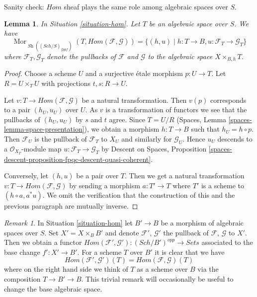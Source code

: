 \documentclass{stacks-project}
\theoremstyle{plain}
\newtheorem{lemma}[subsection]{Lemma}
\theoremstyle{definition}
\theoremstyle{remark}
\newtheorem{remark}[subsection]{Remark}
\numberwithin{equation}{subsection}
\def\Sch{\mathit{Sch}}
\def\Mor{\mathop{\mathrm{Mor}}\nolimits}
\def\Sh{\mathop{\mathit{Sh}}\nolimits}
\begin{document}
\noindent
Sanity check: $\mathit{Hom}$ sheaf plays the same role among algebraic spaces
over $S$.

\begin{lemma}
\label{lemma-extend-hom-to-spaces}
In Situation \ref{situation-hom}. Let $T$ be an algebraic space over $S$.
We have
$$
\Mor_{\Sh((\Sch/S)_{fppf})}(T, \mathit{Hom}(\mathcal{F}, \mathcal{G})) =
\{(h, u) \mid h : T \to B, u : \mathcal{F}_T \to \mathcal{G}_T\}
$$
where $\mathcal{F}_T, \mathcal{G}_T$ denote the pullbacks of $\mathcal{F}$
and $\mathcal{G}$ to the algebraic space $X \times_{B, h} T$.
\end{lemma}

\begin{proof}
Choose a scheme $U$ and a surjective \'etale morphism $p : U \to T$.
Let $R = U \times_T U$ with projections $t, s : R \to U$.

\medskip\noindent
Let $v : T \to \mathit{Hom}(\mathcal{F}, \mathcal{G})$
be a natural transformation. Then $v(p)$ corresponds to a pair
$(h_U, u_U)$ over $U$. As $v$ is a transformation of functors we see
that the pullbacks of $(h_U, u_U)$ by $s$ and $t$ agree.
Since $T = U/R$ (Spaces, Lemma \ref{spaces-lemma-space-presentation}),
we obtain a morphism $h : T \to B$ such that
$h_U = h \circ p$. Then $\mathcal{F}_U$ is the pullback of
$\mathcal{F}_T$ to $X_U$ and similarly for $\mathcal{G}_U$.
Hence $u_U$ descends to a $\mathcal{O}_{X_T}$-module map
$u : \mathcal{F}_T \to \mathcal{G}_T$ by
Descent on Spaces, Proposition
\ref{spaces-descent-proposition-fpqc-descent-quasi-coherent}.

\medskip\noindent
Conversely, let $(h, u)$ be a pair over $T$. Then we get a natural
transformation $v : T \to \mathit{Hom}(\mathcal{F}, \mathcal{G})$
by sending a morphism $a : T' \to T$ where $T'$ is a scheme
to $(h \circ a, a^*u)$. We omit the verification that the construction
of this and the previous paragraph are mutually inverse.
\end{proof}

\begin{remark}
\label{remark-hom-base-change}
In Situation \ref{situation-hom} let $B' \to B$ be a morphism of
algebraic spaces over $S$. Set $X' = X \times_B B'$ and denote
$\mathcal{F}'$, $\mathcal{G}'$ the pullback of
$\mathcal{F}$, $\mathcal{G}$ to $X'$. Then we obtain a functor
$\mathit{Hom}(\mathcal{F}', \mathcal{G}') : (\Sch/B')^{opp} \to \textit{Sets}$
associated to the base change $f' : X' \to B'$. For a scheme $T$ over $B'$
it is clear that we have
$$
\mathit{Hom}(\mathcal{F}', \mathcal{G}')(T) =
\mathit{Hom}(\mathcal{F}, \mathcal{G})(T)
$$
where on the right hand side we think of $T$ as a scheme over $B$
via the composition $T \to B' \to B$. This trivial remark
will occasionally be useful to change the base algebraic space.
\end{remark}
\end{document}
